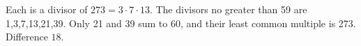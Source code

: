 Each is a divisor of $273=3\cdot7\cdot13$. The divisors no greater than 59 are 1,3,7,13,21,39. Only 21 and 39 sum to 60, and their least common multiple is 273. Difference $\boxed{18}$.
